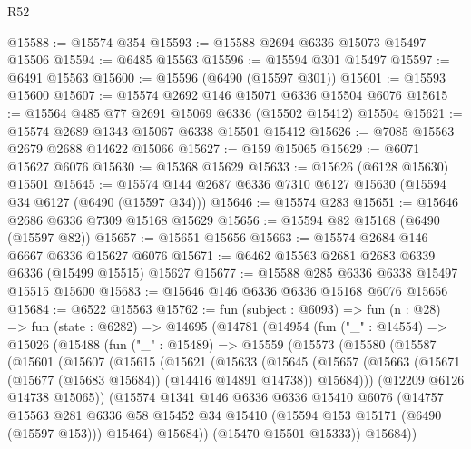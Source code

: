 \begin{lexlean}{R52}
\begin{coremodule}
@15588 := @15574 @354
@15593 := @15588 @2694 @6336 @15073 @15497 @15506
@15594 := @6485 @15563
@15596 := @15594 @301 @15497
@15597 := @6491 @15563
@15600 := @15596 (@6490 (@15597 @301))
@15601 := @15593 @15600
@15607 := @15574 @2692 @146 @15071 @6336 @15504 @6076
@15615 := @15564 @485 @77 @2691 @15069 @6336 (@15502 @15412) @15504
@15621 := @15574 @2689 @1343 @15067 @6338 @15501 @15412
@15626 := @7085 @15563 @2679 @2688 @14622 @15066
@15627 := @159 @15065
@15629 := @6071 @15627 @6076
@15630 := @15368 @15629
@15633 := @15626 (@6128 @15630) @15501
@15645 := @15574 @144 @2687 @6336 @7310 @6127 @15630 (@15594 @34 @6127 (@6490 (@15597 @34)))
@15646 := @15574 @283
@15651 := @15646 @2686 @6336 @7309 @15168 @15629
@15656 := @15594 @82 @15168 (@6490 (@15597 @82))
@15657 := @15651 @15656
@15663 := @15574 @2684 @146 @6667 @6336 @15627 @6076
@15671 := @6462 @15563 @2681 @2683 @6339 @6336 (@15499 @15515) @15627
@15677 := @15588 @285 @6336 @6338 @15497 @15515 @15600
@15683 := @15646 @146 @6336 @6336 @15168 @6076 @15656
@15684 := @6522 @15563
@15762 := fun (subject : @6093) =>
  fun (n : @28) =>
  fun (state : @6282) =>
  @14695
    (@14781
      (@14954
        (fun ("_" : @14554) =>
        @15026
          (@15488
            (fun ("_" : @15489) =>
            @15559
              (@15573
                (@15580
                  (@15587
                    (@15601
                      (@15607
                        (@15615
                          (@15621
                            (@15633
                              (@15645
                                (@15657
                                  (@15663
                                    (@15671 (@15677 (@15683 @15684)) (@14416 @14891 @14738))
                                    @15684)))
                              (@12209 @6126 @14738 @15065))
                            (@15574
                              @1341
                              @146
                              @6336
                              @6336
                              @15410
                              @6076
                              (@14757
                                @15563
                                @281
                                @6336
                                @58
                                @15452
                                @34
                                @15410
                                (@15594 @153 @15171 (@6490 (@15597 @153)))
                                @15464)
                              @15684))
                          (@15470 @15501 @15333))
                        @15684))

\end{coremodule}
\end{lexlean}
